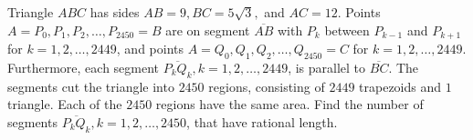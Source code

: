 Triangle $ABC$ has sides $AB=9,BC = 5\sqrt{3},$ and $AC=12$. Points $A=P_0, P_1, P_2, \dots, P_{2450} = B$ are on segment $\overline{AB}$ with $P_k$ between $P_{k-1}$ and $P_{k+1}$ for $k=1,2,\dots,2449$, and points $A=Q_0, Q_1, Q_2, \dots ,Q_{2450} = C$ for $k=1,2,\dots,2449$. Furthermore, each segment $\overline{P_kQ_k}, k=1,2,\dots,2449$, is parallel to $\overline{BC}$. The segments cut the triangle into $2450$ regions, consisting of $2449$ trapezoids and $1$ triangle. Each of the $2450$ regions have the same area. Find the number of segments $\overline{P_kQ_k}, k=1,2 ,\dots,2450$, that have rational length.
